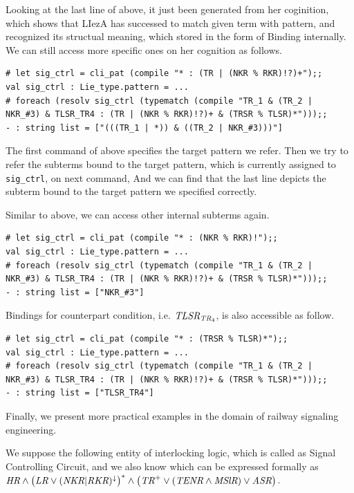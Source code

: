 \documentclass[12pt]{article}
\begin{document}
Looking at the last line of above, it just been generated from her
coginition, which shows that LIezA has successed to match given term with
pattern, and recognized its structual meaning, which stored in the form of
Binding internally. We can still access more specific ones on her
cognition as follows.
\begin{verbatim}
# let sig_ctrl = cli_pat (compile "* : (TR | (NKR % RKR)!?)+");;
val sig_ctrl : Lie_type.pattern = ...
# foreach (resolv sig_ctrl (typematch (compile "TR_1 & (TR_2 |
NKR_#3) & TLSR_TR4 : (TR | (NKR % RKR)!?)+ & (TRSR % TLSR)*")));;
- : string list = ["(((TR_1 | *)) & ((TR_2 | NKR_#3)))"]
\end{verbatim}

The first command of above specifies the target pattern we refer.
Then we try to refer the subterms bound to the target
pattern, which is currently assigned to \verb|sig_ctrl|, on next command,
And we can find that the last line depicts the subterm bound to the target
pattern we specified correctly.

Similar to above, we can access other internal subterms again.
\begin{verbatim}
# let sig_ctrl = cli_pat (compile "* : (NKR % RKR)!");;
val sig_ctrl : Lie_type.pattern = ...
# foreach (resolv sig_ctrl (typematch (compile "TR_1 & (TR_2 |
NKR_#3) & TLSR_TR4 : (TR | (NKR % RKR)!?)+ & (TRSR % TLSR)*")));;
- : string list = ["NKR_#3"]
\end{verbatim}

Bindings for counterpart condition, i.e.
$\text{\it TLSR}_{{\text{\it TR}_4}}$, is also accessible as follow.
\begin{verbatim}
# let sig_ctrl = cli_pat (compile "* : (TRSR % TLSR)*");;
val sig_ctrl : Lie_type.pattern = ...
# foreach (resolv sig_ctrl (typematch (compile "TR_1 & (TR_2 |
NKR_#3) & TLSR_TR4 : (TR | (NKR % RKR)!?)+ & (TRSR % TLSR)*")));;
- : string list = ["TLSR_TR4"]
\end{verbatim}

Finally, we present more practical examples in the domain of railway
signaling engineering.

We suppose the following entity of interlocking logic, which is called as
Signal Controlling Circuit, and we also know which can be expressed formally
as
$\text{\it HR} \wedge \bigl(\text{\it LR} \vee
(\text{\it NKR} | \text{\it RKR})^\downarrow \bigr)^* \wedge
\bigl(\text{\it TR}^+ \vee (\text{\it TENR} \wedge \text{\it MSlR}) \vee
\text{\it ASR} \bigr)$.
\end{document}
